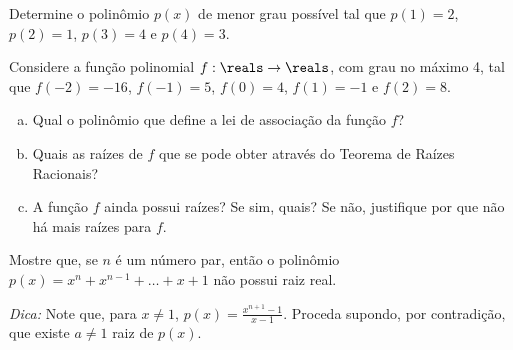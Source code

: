 \begin{exercise}
    Determine o polinômio $p(x)$ de menor grau possível tal que
    $p(1) = 2$, $p(2)=1$, $p(3) = 4$ e $p(4) = 3$.
\end{exercise}

\begin{exercise}
    Considere a função polinomial $f: \reals \to \reals$, com grau no máximo 4, tal que $f(-2) = -16$, $f(-1) =5$, $f(0)= 4$, $f(1) = -1$ e $f(2) = 8$.

    \begin{enumerate}[a)]
        \item Qual o polinômio que define a lei de associação da função $f$?
        \item Quais as raízes de $f$ que se pode obter através do Teorema de Raízes Racionais?
        \item A função $f$ ainda possui raízes? Se sim, quais? Se não, justifique por que não há mais raízes para $f$.
    \end{enumerate}
\end{exercise}

\begin{exercise}
Mostre que, se $n$ é um número par, então o polinômio $p(x) =
x^n + x^{n-1} + \dots + x+1$ não possui raiz real.

\noindent \emph{Dica: } Note que, para $x \neq 1$, $p(x) =
\frac{x^{n+1}-1}{x-1}$. Proceda supondo, por contradição, que existe
$a \neq 1$ raiz de $p(x)$.
\end{exercise}
